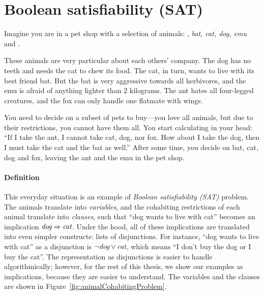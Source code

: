 \def\ant{\text{\em ant}}
\def\bat{\text{\em bat}}
\def\cat{\text{\em cat}}
\def\dog{\text{\em dog}}
\def\emu{\text{\em emu}}
\def\fox{\text{\em fox}}


\section{Boolean satisfiability (SAT)}
\label{sec:SAT-intro}

Imagine you are in a pet shop with a selection of animals: \ant, {\em bat, cat, dog, emu} and \fox.

These animals are very particular about each others' company. The dog has no teeth and needs the cat to chew its food. The cat, in turn, wants to live with its best friend bat. 
But the bat is very aggressive towards all herbivores, and the emu is afraid of anything lighter than 2 kilograms. The ant hates all four-legged creatures, and the fox can only handle one flatmate with wings. 

You need to decide on a subset of pets to buy---you love all animals, but due to their restrictions, you cannot have them all. You start calculating in your head: ``If I take the ant, I cannot take cat, dog, nor fox. How about I take the dog, then I must take the cat and the bat as well.''
After some time, you decide on bat, cat, dog and fox, leaving the ant and the emu in the pet shop.

\paragraph{Definition}

This everyday situation is an example of \emph{Boolean satisfiability (SAT)} problem.
The animals translate into \emph{variables}, %
and the cohabiting restrictions of each animal translate into \emph{clauses},
such that ``dog wants to live with cat'' becomes an implication $\dog \Rightarrow \cat$.
Under the hood, all of these implications are translated into even simpler constructs: lists of disjunctions.
For instance, ``dog wants to live with cat'' as a disjunction is %
$\neg\dog \vee \cat{}$, which means ``I don't buy the dog or I buy the cat''.
The representation as disjunctions is easier to handle algorithmically; however,
for the rest of this thesis, we show our examples as implications, because they are easier to understand.
The variables and the clauses are shown in Figure~\ref{fig:animalCohabitingProblem}.


